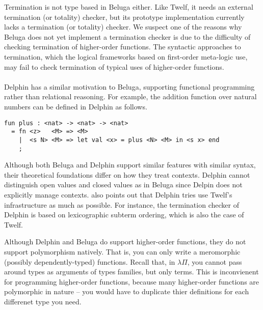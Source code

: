 Termination is not type based in Beluga either. Like Twelf, it needs
an external termination (or totality) checker, but its prototype
implementation currently lacks a termination (or totality) checker.
We suspect one of the reasons why Beluga does not yet implement
a termination checker is due to the difficulty of checking termination
of higher-order functions. The syntactic approaches to termination,
which the logical frameworks based on first-order meta-logic use,
may fail to check termination of typical uses of higher-order functions.

\paragraph{}
Delphin \cite{pos08phd} has a similar motivation to Beluga,
supporting functional programming rather than relational reasoning.
For example, the addition function over natural numbers can be defined
in Delphin as follows.\vspace{-2em}
\begin{singlespace}
\begin{verbatim}
fun plus : <nat> -> <nat> -> <nat> 
  = fn <z>   <M> => <M>
    |  <s N> <M> => let val <x> = plus <N> <M> in <s x> end
    ;
\end{verbatim}
\end{singlespace}\noindent
Although both Beluga and Delphin support similar features with similar syntax,
their theoretical foundations differ \cite{Pie10} on how they treat contexts.
Delphin cannot distinguish open values and closed values as in Beluga
since Delpin does not explicitly manage contexts.
\citet{Pie10} also points out that Delphin tries use Twelf's infrastructure
as much as possible. For instance, the termination checker of Delphin is
based on lexicographic subterm ordering, which is also the case of Twelf.

Although Delphin and Beluga do support higher-order functions,
they do not support polymorphism natively. That is, you can only write
a meromorphic (possibly dependently-typed) functions. Recall that,
in $\lambda\Pi$, you cannot pass around types as arguments of types families,
but only terms. This is inconvienent for programming higher-order functions,
because many higher-order functions are polymorphic in nature -- you would
have to duplicate thier definitions for each differenet type you need.

